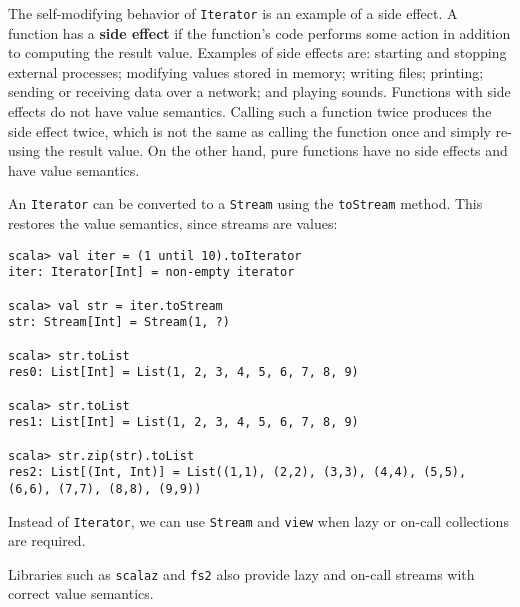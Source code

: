 The self-modifying behavior of \lstinline!Iterator! is an example
of a side effect. A function has a \textbf{side
effect} if the function\textsf{'}s code performs some action in addition to
computing the result value. Examples of side effects are: starting
and stopping external processes; modifying values stored in memory;
writing files; printing; sending or receiving data over a network;
and playing sounds. Functions with side effects do not have value
semantics. Calling such a function twice produces the side effect
twice, which is not the same as calling the function once and simply
re-using the result value. On the other hand, pure
functions have no side effects and have value semantics.

An \lstinline!Iterator! can be converted to a \lstinline!Stream!
using the \lstinline!toStream! method. This restores the value semantics,
since streams are values:
\begin{lstlisting}
scala> val iter = (1 until 10).toIterator
iter: Iterator[Int] = non-empty iterator

scala> val str = iter.toStream
str: Stream[Int] = Stream(1, ?)

scala> str.toList
res0: List[Int] = List(1, 2, 3, 4, 5, 6, 7, 8, 9)

scala> str.toList
res1: List[Int] = List(1, 2, 3, 4, 5, 6, 7, 8, 9)

scala> str.zip(str).toList
res2: List[(Int, Int)] = List((1,1), (2,2), (3,3), (4,4), (5,5), (6,6), (7,7), (8,8), (9,9)) 
\end{lstlisting}
Instead of \lstinline!Iterator!, we can use \lstinline!Stream! and
\lstinline!view! when lazy or on-call collections are required.

Libraries such as \lstinline!scalaz! and \lstinline!fs2! also provide
lazy and on-call streams with correct value semantics.
